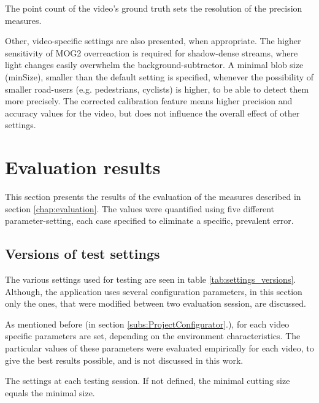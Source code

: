 The point count of the video's ground truth sets the resolution of the precision measures.

Other, video-specific settings are also presented, when appropriate.
The higher sensitivity of MOG2 overreaction is required for shadow-dense streams, where light changes easily overwhelm the background-subtractor.
A minimal blob size (minSize), smaller than the default setting is specified, whenever the possibility of smaller road-users (e.g. pedestrians, cyclists) is higher, to be able to detect them more precisely.
The corrected calibration feature means higher precision and accuracy values for the video, but does not influence the overall effect of other settings. 
\FloatBarrier

\section{Evaluation results}
This section presents the results of the evaluation of the measures described in section \ref{chap:evaluation}.
The values were quantified using five different parameter-setting, each case specified to eliminate a specific, prevalent error.

\subsection{Versions of test settings}
The various settings used for testing are seen in table \ref{tab:settings_versions}.
Although, the application uses several configuration parameters, in this section only the ones, that were modified between two evaluation session, are discussed.

As mentioned before (in section \ref{subs:ProjectConfigurator}.), for each video specific parameters are set, depending on the environment characteristics.
The particular values of these parameters were evaluated empirically for each video, to give the best results possible, and is not discussed in this work.

\begin{table}[!h]
	\begin{adjustbox}{center}
	\end{adjustbox}
	\caption{The settings at each testing session. If not defined, the minimal cutting size equals the minimal size.}
	\label{tab:settings_versions}
\end{table}

